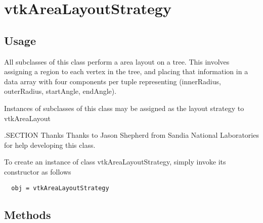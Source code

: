 \section{vtkAreaLayoutStrategy}

\subsection{Usage}

 All subclasses of this class perform a area layout on a tree.
 This involves assigning a region to each vertex in the tree,
 and placing that information in a data array with four components per
 tuple representing (innerRadius, outerRadius, startAngle, endAngle).

 Instances of subclasses of this class may be assigned as the layout
 strategy to vtkAreaLayout

 .SECTION Thanks
 Thanks to Jason Shepherd from Sandia National Laboratories
 for help developing this class.

To create an instance of class vtkAreaLayoutStrategy, simply
invoke its constructor as follows
\begin{verbatim}
  obj = vtkAreaLayoutStrategy
\end{verbatim}
\subsection{Methods}

